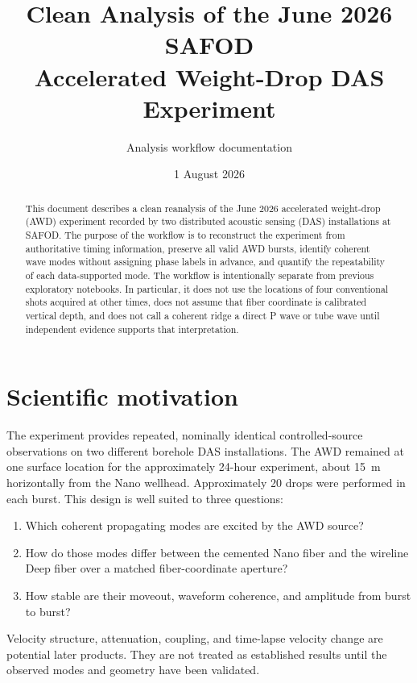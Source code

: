 \documentclass[11pt]{article}
\title{Clean Analysis of the June 2026 SAFOD\\
Accelerated Weight-Drop DAS Experiment}
\author{Analysis workflow documentation}
\date{1 August 2026}
\begin{document}
\maketitle

\begin{abstract}
This document describes a clean reanalysis of the June 2026 accelerated
weight-drop (AWD) experiment recorded by two distributed acoustic sensing
(DAS) installations at SAFOD.  The purpose of the workflow is to reconstruct
the experiment from authoritative timing information, preserve all valid AWD
bursts, identify coherent wave modes without assigning phase labels in
advance, and quantify the repeatability of each data-supported mode.  The
workflow is intentionally separate from previous exploratory notebooks.  In
particular, it does not use the locations of four conventional shots acquired
at other times, does not assume that fiber coordinate is calibrated vertical
depth, and does not call a coherent ridge a direct P wave or tube wave until
independent evidence supports that interpretation.
\end{abstract}

\section{Scientific motivation}

The experiment provides repeated, nominally identical controlled-source
observations on two different borehole DAS installations.  The AWD remained at
one surface location for the approximately 24-hour experiment, about 15~m
horizontally from the Nano wellhead.  Approximately 20 drops were performed in
each burst.  This design is well suited to three questions:

\begin{enumerate}[label=\arabic*.]
    \item Which coherent propagating modes are excited by the AWD source?
    \item How do those modes differ between the cemented Nano fiber and the
          wireline Deep fiber over a matched fiber-coordinate aperture?
    \item How stable are their moveout, waveform coherence, and amplitude from
          burst to burst?
\end{enumerate}

Velocity structure, attenuation, coupling, and time-lapse velocity change are
potential later products.  They are not treated as established results until
the observed modes and geometry have been validated.
\end{document}
